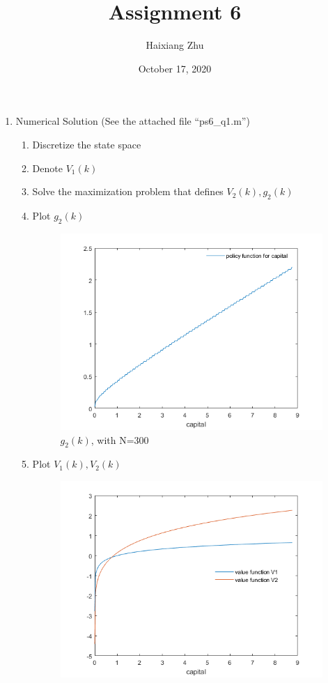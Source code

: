 \documentclass{article}
\title{Assignment 6}
\date{October 17, 2020}
\author{Haixiang Zhu}
\begin{document}
\maketitle
    \begin{enumerate}
        \item Numerical Solution (See the attached file ``ps6\_q1.m'')
        \begin{enumerate}
            \item Discretize the state space
            \item Denote $V_1(k)$
            \item Solve the maximization problem that defines $V_2(k),g_2(k)$
            \item Plot $g_2(k)$
            \begin{figure}[h!]
                \includegraphics[width=\linewidth]{6_1d.png}
                \caption{$g_2(k)$, with N=300}
            \end{figure}
            \item Plot $V_1(k),V_2(k)$
            \clearpage
            \begin{figure}[h!]
                \includegraphics[width=\linewidth]{6_1e.png}

\end{figure}
\end{enumerate}
\end{enumerate}
\end{document}
